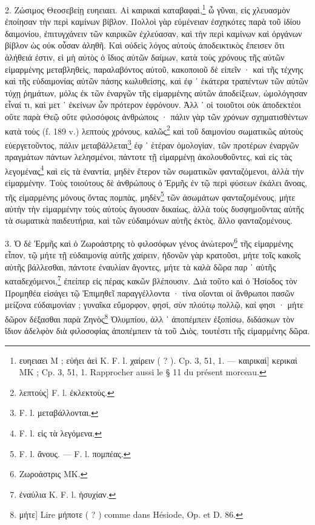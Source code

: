 \documentclass[a4paper, 11pt, oneside, polutonikogreek, french]{article}
\begin{document}
2. Ζώσιμος Θεοσεβείῃ ευηειαει. Αἱ καιρικαὶ καταβαφαὶ,\footnote{ευηειαει M ; εὐήει ἀεὶ K. F. l. χαίρειν ( ? ). Cp. 3, 51, 1. --- καιρικαὶ] κερικαὶ MK ; Cp. 3, 51, 1. Rapprocher aussi le § 11 du présent morceau.} ὦ γῦναι, εἰς χλευασμὸν ἐποίησαν τὴν περὶ καμίνων βίβλον. Πολλοὶ γὰρ εὐμένειαν ἐσχηκότες παρὰ τοῦ ἰδίου δαιμονίου, ἐπιτυγχάνειν τῶν καιρικῶν ἐχλεύασαν, καὶ τὴν περὶ καμίνων καὶ ὀργάνων βίβλον ὡς οὐκ οὖσαν ἀληθῆ. Καὶ οὐδεὶς λόγος αὐτοὺς ἀποδεικτικὸς ἔπεισεν ὅτι ἀλήθειά ἐστιν, εἰ μὴ αὐτὸς ὁ ἴδιος αὐτῶν δαίμων, κατὰ τοὺς χρόνους τῆς αὐτῶν εἱμαρμένης μεταβληθεὶς, παραλαβόντος αὐτοῦ, κακοποιοῦ δὲ εἰπεῖν · καὶ τῆς τέχνης καὶ τῆς εὐδαιμονίας αὐτῶν πάσης κωλυθείσης, καὶ ἐφ ᾽ ἑκάτερα τραπέντων τῶν αὐτῶν τύχῃ ῥημάτων, μόλις ἐκ τῶν ἐναργῶν τῆς εἱμαρμένης αὐτῶν ἀποδείξεων, ὡμολόγησαν εἶναί τι, καὶ μετ ῾ ἐκείνων ὧν πρότερον ἐφρόνουν. Ἀλλ ᾽ οἱ τοιοῦτοι οὐκ ἀποδεκτέοι οὔτε παρὰ Θεῷ οὔτε φιλοσόφοις ἀνθρώποις · πάλιν γὰρ τῶν χρόνων σχηματισθέντων κατὰ τοὺς (f. 189 v.) λεπτοὺς χρόνους, καλῶς\footnote{λεπτοὺς] F. l. ἐκλεκτοὺς.} καὶ τοῦ δαιμονίου σωματικῶς αὐτοὺς εὐεργετοῦντος, πάλιν μεταβάλλεται\footnote{F. l. μεταβάλλονται.} ἐφ ᾽ ἑτέραν ὁμολογίαν, τῶν προτέρων ἐναργῶν πραγμάτων πάντων λελησμένοι, πάντοτε τῇ εἱμαρμένῃ ἀκολουθοῦντες, καὶ εἰς τὰς λεγομένας\footnote{F. l. εἰς τὰ λεγόμενα.} καὶ εἰς τὰ ἐναντία, μηδὲν ἕτερον τῶν σωματικῶν φανταζόμενοι, ἀλλὰ τὴν εἱμαρμένην. Τοὺς τοιούτους δὲ ἀνθρώπους ὁ Ἑρμῆς ἐν τῷ περὶ φύσεων ἐκάλει ἄνοας, τῆς εἱμαρμένης μόνους ὄντας πομπὰς, μηδὲν\footnote{F. l. ἄνους. --- F. l. πομπέας.} τῶν ἀσωμάτων φανταζομένους, μήτε αὐτὴν τὴν εἱμαρμένην τοὺς αὐτοὺς ἄγουσαν δικαίως, ἀλλὰ τοὺς δυσφημοῦντας αὐτῆς τὰ σωματικὰ παιδευτήρια, καὶ τῶν εὐδαιμόνων αὐτῆς ἐκτὸς, ἄλλο φανταζομένους.

3. Ὁ δὲ Ἑρμῆς καὶ ὁ Ζωροάστρης τὸ φιλοσόφων γένος ἀνώτερον\footnote{Ζωροάστρις MK.} τῆς εἱμαρμένης εἶπον, τῷ μήτε τῇ εὐδαιμονίᾳ αὐτῆς χαίρειν, ἡδονῶν γὰρ κρατοῦσι, μήτε τοῖς κακοῖς αὐτῆς βάλλεσθαι, πάντοτε ἐναυλίαν ἄγοντες, μήτε τὰ καλὰ δῶρα παρ ᾽ αὐτῆς καταδεχόμενοι,\footnote{ἐναύλια K. F. l. ἡσυχίαν.} ἐπείπερ εἰς πέρας κακῶν βλέπουσιν. Διὰ τοῦτο καὶ ὁ Ἡσίοδος τὸν Προμηθέα εἰσάγει τῷ Ἐπιμηθεῖ παραγγέλλοντα · τίνα οἴονται οἱ ἄνθρωποι πασῶν μείζονα εὐδαιμονίαν ; γυναῖκα εὔμορφον, φησὶ, σὺν πλούτῳ πολλῷ, καί φησι · μήτε δῶρον δέξασθαι παρὰ Ζηνὸς\footnote{μήτε] Lire μήποτε ( ? ) comme dans Hésiode, Op. et D. 86.} Ὀλυμπίου, ἀλλ ᾽ ἀποπέμπειν ἐξοπίσω, διδάσκων τὸν ἴδιον ἀδελφὸν διὰ φιλοσοφίας ἀποπέμπειν τὰ τοῦ Διὸς, τουτέστι τῆς εἱμαρμένης δῶρα.
\end{document}
